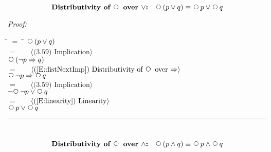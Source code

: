 \documentclass[fleqn, leqno]{article}
\newcommand{\lgap}{2pt}                             %
\newcommand{\mymathindent}{24pt}                    %
\newcommand{\Next}{\;\,\text{\raisebox{3.5pt}{\circle{6}}}}
\newcommand{\myqed}{\hfill\rule[-.23ex]{1.2ex}{2.0ex}}
\newcommand{\Gll} {\langle}                         %
\newcommand{\Ggg} {\rangle}                         %
\newcommand{\Hint}[1]     {\ \ \ $\Gll              \mbox{#1} \Ggg$ }   %
\begin{document}
\begin{equation}\label{E:distNextOr}
\textbf{Distributivity of $\Next$ over $\lor$:}\quad \Next (p \lor q) \equiv \Next p \lor \Next q
\end{equation}


\emph{Proof:}
\begin{tabbing}
\hspace{\mymathindent} \= $= \;$ \= \kill
	\> \>   $\Next(p \lor q)$\\[\lgap]
	\> $=$  \>  \Hint{(3.59) Implication}\\[\lgap]
	\> \>   $\Next(\lnot p \Rightarrow q)$\\[\lgap]
	\> $=$  \>  \Hint{(\ref{E:distNextImp}) Distributivity of $\Next$ over $\Rightarrow$}\\[\lgap]
	\> \>   $\Next\lnot p \Rightarrow \Next q$\\[\lgap]
	\> $=$  \>  \Hint{(3.59) Implication}\\[\lgap]
	\> \>   $\lnot\Next\lnot p \lor \Next q$\\[\lgap]
	\> $=$  \>  \Hint{(\ref{E:linearity}) Linearity}\\[\lgap]
	\> \>   $\Next p \lor \Next q$
\end{tabbing}
\myqed\\[\lgap]

\begin{equation}\label{E:distNextAnd}
\textbf{Distributivity of $\Next$ over $\land$:}\quad \Next (p \land q) \equiv \Next p \land \Next q
\end{equation}
\end{document}
